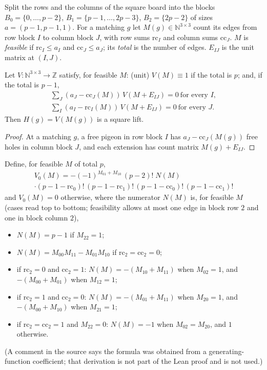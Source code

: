Split the rows and the columns of the square board into the blocks
$B_0=\{0,\dots,p-2\}$, $B_1=\{p-1,\dots,2p-3\}$, $B_2=\{2p-2\}$ of sizes
$a=(p-1,p-1,1)$.  For a
matching $g$ let $M(g)\in\mathbb N^{3\times3}$ count its edges from row block $I$ to
column block $J$, with row sums $\mathrm{rc}_I$ and column sums $\mathrm{cc}_J$.
$M$ is \emph{feasible} if $\mathrm{rc}_I\le a_I$ and $\mathrm{cc}_J\le a_J$; its
\emph{total} is the number of edges.  $E_{IJ}$ is the unit matrix at
$(I,J)$.

\begin{lemma}\label{lem:certificate}
Let $V\colon\mathbb N^{3\times3}\to\mathbb Z$ satisfy, for feasible $M$:
(unit) $V(M)\equiv1$ if the total is $p$; and, if the total is $p-1$,
\begin{gather*}
\textstyle\sum_J(a_J-\mathrm{cc}_J(M))\,V(M+E_{IJ})=0\ \text{for every }I,\\
\textstyle\sum_I(a_I-\mathrm{rc}_I(M))\,V(M+E_{IJ})=0\ \text{for every }J .
\end{gather*}
Then $H(g)=V(M(g))$ is a square lift.
\end{lemma}

\begin{proof}
At a matching $g$, a free pigeon in row block $I$ has $a_J-\mathrm{cc}_J(M(g))$ free
holes in column block $J$, and each extension has count matrix $M(g)+E_{IJ}$.
\end{proof}

Define, for feasible $M$ of total $p$,
\begin{multline*}
V_0(M)=-(-1)^{M_{01}+M_{10}}\,(p-2)!\;N(M)\\
\cdot(p-1-\mathrm{rc}_0)!\,(p-1-\mathrm{rc}_1)!\,(p-1-\mathrm{cc}_0)!\,(p-1-\mathrm{cc}_1)!
\end{multline*}
and $V_0(M)=0$ otherwise, where the numerator $N(M)$ is, for feasible $M$ (cases
read top to bottom; feasibility allows at most one edge in block row $2$ and one in
block column $2$),
\begin{itemize}
\item $N(M)=p-1$ if $M_{22}=1$;
\item $N(M)=M_{00}M_{11}-M_{01}M_{10}$ if $\mathrm{rc}_2=\mathrm{cc}_2=0$;
\item if $\mathrm{rc}_2=0$ and $\mathrm{cc}_2=1$: $N(M)=-(M_{10}+M_{11})$ when
$M_{02}=1$, and $-(M_{00}+M_{01})$ when $M_{12}=1$;
\item if $\mathrm{rc}_2=1$ and $\mathrm{cc}_2=0$: $N(M)=-(M_{01}+M_{11})$ when
$M_{20}=1$, and $-(M_{00}+M_{10})$ when $M_{21}=1$;
\item if $\mathrm{rc}_2=\mathrm{cc}_2=1$ and $M_{22}=0$: $N(M)=-1$ when
$M_{02}=M_{20}$, and $1$ otherwise.
\end{itemize}
(A comment in the source says the formula was obtained from a generating-function
coefficient; that derivation is not part of the Lean proof and is not used.)

